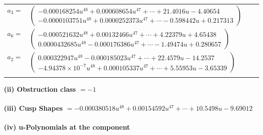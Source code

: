 \documentclass[1p]{elsarticle_modified}
\theoremstyle{definition}
\begin{document}
\begin{tabular}{m{7pt} m{180pt} m{7pt} m{180pt} }
\flushright $a_{3}=$&$\begin{pmatrix}-0.000168254 u^{48}+0.000608654 u^{47}+\cdots+21.4016 u-4.40654\\-0.0000103751 u^{48}+0.0000252373 u^{47}+\cdots-0.598442 u+0.217313\end{pmatrix}$ \\
\flushright $a_{6}=$&$\begin{pmatrix}-0.000521632 u^{48}+0.00132466 u^{47}+\cdots+4.22379 u+4.65438\\0.0000432685 u^{48}-0.000176386 u^{47}+\cdots-1.49474 u+0.280657\end{pmatrix}$ \\
\flushright $a_{2}=$&$\begin{pmatrix}0.000322947 u^{48}-0.000185023 u^{47}+\cdots+22.4579 u-14.2537\\-4.94378\times10^{-7} u^{48}+0.000105337 u^{47}+\cdots+5.55953 u-3.65339\end{pmatrix}$\\&\end{tabular}
\flushleft \textbf{(ii) Obstruction class $= -1$}\\~\\
\flushleft \textbf{(iii) Cusp Shapes $= -0.000380518 u^{48}+0.00154592 u^{47}+\cdots+10.5498 u-9.69012$}\\~\\
\newpage\renewcommand{\arraystretch}{1}
\flushleft \textbf{(iv) u-Polynomials at the component}\newline \\
\end{document}
